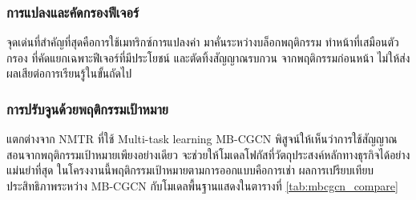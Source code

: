 \subsubsection{การแปลงและคัดกรองฟีเจอร์}
จุดเด่นที่สำคัญที่สุดคือการใช้เมทริกซ์การแปลงค่า มาคั่นระหว่างบล็อกพฤติกรรม ทำหน้าที่เสมือนตัวกรอง ที่คัดแยกเฉพาะฟีเจอร์ที่มีประโยชน์ และตัดทิ้งสัญญาณรบกวน จากพฤติกรรมก่อนหน้า ไม่ให้ส่งผลเสียต่อการเรียนรู้ในขั้นถัดไป

\subsubsection{การปรับจูนด้วยพฤติกรรมเป้าหมาย}
แตกต่างจาก NMTR ที่ใช้ Multi-task learning MB-CGCN พิสูจน์ให้เห็นว่าการใช้สัญญาณสอนจากพฤติกรรมเป้าหมายเพียงอย่างเดียว จะช่วยให้โมเดลโฟกัสที่วัตถุประสงค์หลักทางธุรกิจได้อย่างแม่นยำที่สุด ในโครงงานนี้พฤติกรรมเป้าหมายตามการออกแบบคือการเช่า ผลการเปรียบเทียบประสิทธิภาพระหว่าง MB-CGCN กับโมเดลพื้นฐานแสดงในตารางที่ \ref{tab:mbcgcn_compare}
                                     
